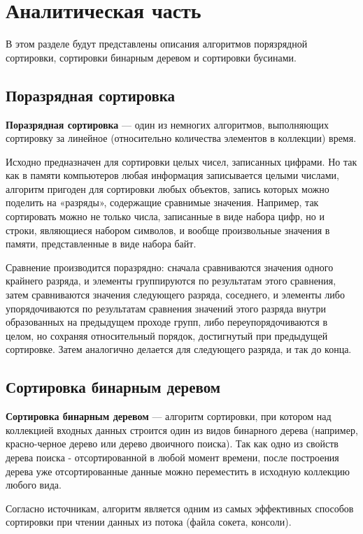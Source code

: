 \chapter{Аналитическая часть}
В этом разделе будут представлены описания алгоритмов порязрядной сортировки,
сортировки бинарным деревом и сортировки бусинами.

\section{Поразрядная сортировка}

\textbf{Поразрядная сортировка}\cite{sheyker} — один из немногих алгоритмов,
выполняющих сортировку за линейное (относительно количества элементов в
коллекции) время.


Исходно предназначен для сортировки целых чисел, записанных цифрами.
Но так как в памяти компьютеров любая информация записывается целыми числами,
алгоритм пригоден для сортировки любых объектов, запись которых можно поделить
на «разряды», содержащие сравнимые значения. Например, так сортировать можно
не только числа, записанные в виде набора цифр, но и строки, являющиеся набором
символов, и вообще произвольные значения в памяти, представленные в виде
набора байт.


Сравнение производится поразрядно: сначала сравниваются значения одного
крайнего разряда, и элементы группируются по результатам этого сравнения,
затем сравниваются значения следующего разряда, соседнего, и элементы либо
упорядочиваются по результатам сравнения значений этого разряда внутри
образованных на предыдущем проходе групп, либо переупорядочиваются в
целом, но сохраняя относительный порядок, достигнутый при предыдущей
сортировке. Затем аналогично делается для следующего разряда, и так до конца.


\section{Сортировка бинарным деревом}

\textbf{Сортировка бинарным деревом}\cite{insert} — алгоритм сортировки,
при котором над коллекцией входных данных строится один из видов бинарного
дерева (например, красно-черное дерево или дерево двоичного поиска). Так как
одно из свойств дерева поиска - отсортированной в любой момент времени, после
построения дерева уже отсортированные данные можно переместить в исходную
коллекцию любого вида.


Согласно источникам\cite{bintree}, алгоритм является одним из самых эффективных
способов сортировки при чтении данных из потока (файла сокета, консоли).


